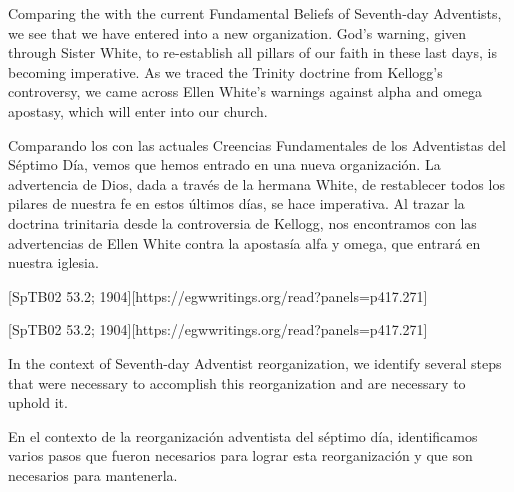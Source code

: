 Comparing the  with the current Fundamental Beliefs of Seventh-day Adventists, we see that we have entered into a new organization. God’s warning, given through Sister White, to re-establish all pillars of our faith in these last days, is becoming imperative. As we traced the Trinity doctrine from Kellogg's controversy, we came across Ellen White’s warnings against alpha and omega apostasy, which will enter into our church.


Comparando los  con las actuales Creencias Fundamentales de los Adventistas del Séptimo Día, vemos que hemos entrado en una nueva organización. La advertencia de Dios, dada a través de la hermana White, de restablecer todos los pilares de nuestra fe en estos últimos días, se hace imperativa. Al trazar la doctrina trinitaria desde la controversia de Kellogg, nos encontramos con las advertencias de Ellen White contra la apostasía alfa y omega, que entrará en nuestra iglesia.


[SpTB02 53.2; 1904][https://egwwritings.org/read?panels=p417.271]


[SpTB02 53.2; 1904][https://egwwritings.org/read?panels=p417.271]


In the context of Seventh-day Adventist reorganization, we identify several steps that were necessary to accomplish this reorganization and are necessary to uphold it.


En el contexto de la reorganización adventista del séptimo día, identificamos varios pasos que fueron necesarios para lograr esta reorganización y que son necesarios para mantenerla.


